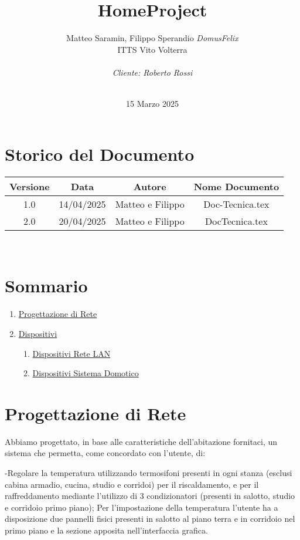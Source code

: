 \documentclass[italian, 12pt, a4paper]{article}
\title{\huge{HomeProject}}
\author{Matteo Saramin, Filippo Sperandio \textit{DomusFelix} \\ {\small ITTS Vito Volterra} \\ \\ \emph{Cliente: Roberto Rossi}}
\date{\version\\ 15 Marzo 2025}
\begin{document}
\maketitle
\section{Storico del Documento}
\begin{center}
    \renewcommand{\arraystretch}{1.5} %
    \begin{tabular}{|c|c|c|c|}
        \hline
        \rowcolor{violet!30}
        Versione & Data & Autore & Nome Documento \\
        \hline
        1.0 & 14/04/2025 & Matteo e Filippo & Doc-Tecnica.tex \\
        \hline
        2.0 & 20/04/2025 & Matteo e Filippo & DocTecnica.tex \\
        \hline
    \end{tabular}\\[4mm]
\end{center}
\clearpage
\section{Sommario}
\begin{enumerate}
    \item \hyperref[sec:progettazione]{\Large Progettazione di Rete}
    \item \hyperref[sec:dispositivi]{\Large Dispositivi}
    \begin{enumerate}
        \item \hyperref[sec:lan]{Dispositivi Rete LAN}
        \item \hyperref[sec:domotico]{Dispositivi Sistema Domotico}
    \end{enumerate}
\end{enumerate}
\clearpage
\section{Progettazione di Rete}\label{sec:progettazione}
Abbiamo progettato, in base alle caratteristiche dell'abitazione fornitaci, un sistema  che permetta, come concordato con l’utente, di: 

-Regolare la temperatura utilizzando termosifoni presenti in ogni stanza (esclusi cabina armadio, cucina, studio e corridoi) per il riscaldamento, e per il raffreddamento mediante l’utilizzo di 3 condizionatori (presenti in salotto, studio e corridoio primo piano);
Per l'impostazione della temperatura l’utente ha a disposizione due pannelli fisici presenti in salotto al piano terra e in corridoio nel primo piano e la sezione apposita nell’interfaccia grafica.
\end{document}
